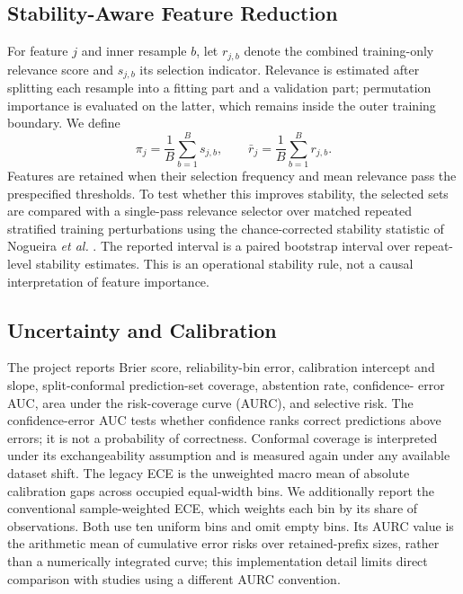 \documentclass[journal]{IEEEtran}
\begin{document}
\subsection{Stability-Aware Feature Reduction}
For feature $j$ and inner resample $b$, let $r_{j,b}$ denote the combined
training-only relevance score and $s_{j,b}$ its selection indicator. Relevance
is estimated after splitting each resample into a fitting part and a validation
part; permutation importance is evaluated on the latter, which remains inside
the outer training boundary. We define
\begin{equation}
\pi_j = \frac{1}{B}\sum_{b=1}^{B}s_{j,b}, \qquad
\bar r_j = \frac{1}{B}\sum_{b=1}^{B}r_{j,b}.
\end{equation}
Features are retained when their selection frequency and mean relevance pass
the prespecified thresholds. To test whether this improves stability, the
selected sets are compared with a single-pass relevance selector over matched
repeated stratified training perturbations using the chance-corrected stability
statistic of Nogueira \emph{et al.} \cite{nogueira2018stability}. The reported
interval is a paired bootstrap interval over repeat-level stability estimates.
This is an operational stability rule, not a causal interpretation of feature
importance.

\subsection{Uncertainty and Calibration}
The project reports Brier score, reliability-bin error, calibration intercept
and slope, split-conformal prediction-set coverage, abstention rate, confidence-
error AUC, area under the risk-coverage curve (AURC), and selective risk. The
confidence-error AUC tests whether confidence ranks correct predictions above
errors; it is not a probability of correctness. Conformal coverage is
interpreted under its exchangeability assumption \cite{angelopoulos2023conformal}
and is measured again under any available dataset shift.
The legacy ECE is the unweighted macro mean of absolute calibration gaps across
occupied equal-width bins. We additionally report the conventional sample-weighted
ECE, which weights each bin by its share of observations. Both use ten uniform
bins and omit empty bins. Its AURC value is
the arithmetic mean of cumulative error risks over retained-prefix sizes,
rather than a numerically integrated curve; this implementation detail limits
direct comparison with studies using a different AURC convention.
\end{document}

